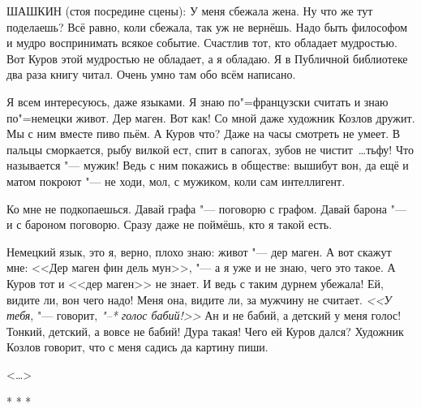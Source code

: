 ШАШКИН (стоя посредине сцены): У меня сбежала жена. Ну что же тут поделаешь? Всё равно, коли сбежала, так уж не вернёшь. Надо быть философом и мудро воспринимать всякое событие. Счастлив тот, кто обладает мудростью. Вот Куров этой мудростью не обладает, а я обладаю. Я в Публичной библиотеке два раза книгу читал. Очень умно там обо всём написано.

Я всем интересуюсь, даже языками. Я знаю по"=французски считать и знаю по"=немецки живот. Дер маген. Вот как! Со мной даже художник Козлов дружит. Мы с ним вместе пиво пьём. А Куров что? Даже на часы смотреть не умеет. В пальцы сморкается, рыбу вилкой ест, спит в сапогах, зубов не чистит~\dots тьфу! Что называется "--- мужик! Ведь с ним покажись в обществе: вышибут вон, да ещё и матом покроют "--- не ходи, мол, с мужиком, коли сам интеллигент.

Ко мне не подкопаешься. Давай графа "--- поговорю с графом. Давай барона "--- и с бароном поговорю. Сразу даже не поймёшь, кто я такой есть.

Немецкий язык, это я, верно, плохо знаю: живот "--- дер маген. А вот скажут мне: <<Дер маген фин дель мун>>, "--- а я уже и не знаю, чего это такое. А Куров тот и <<дер маген>> не знает. И ведь с таким дурнем убежала! Ей, видите ли, вон чего надо! Меня она, видите ли, за мужчину не считает. \textit{<<У тебя}, "--- говорит, \textit{"--* голос бабий!>>} Ан и не бабий, а детский у меня голос! Тонкий, детский, а вовсе не бабий! Дура такая! Чего ей Куров дался? Художник Козлов говорит, что с меня садись да картину пиши.

\begin{flushright}
<\dots{}>
\end{flushright}

\begin{center}
* * * 
\end{center}

